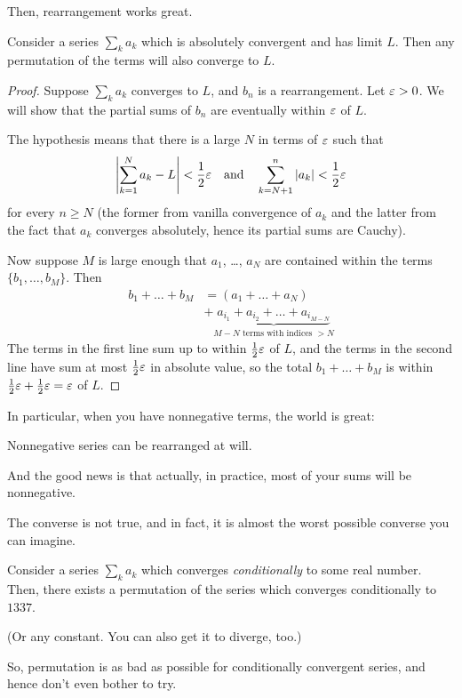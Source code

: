 Then, rearrangement works great.
\begin{theorem}
	Consider a series $\sum_k a_k$ which is absolutely convergent
	and has limit $L$.
	Then any permutation of the terms will also converge to $L$.
\end{theorem}
\begin{proof}
	Suppose $\sum_k a_k$ converges to $L$,
	and $b_n$ is a rearrangement.
	Let $\varepsilon > 0$.
	We will show that the partial sums of $b_n$
	are eventually within $\varepsilon$ of $L$.

	The hypothesis means that there is a large $N$ in terms of $\varepsilon$
	such that
	\[ \left\lvert \sum_{k=1}^N a_k - L \right\rvert < \frac{1}{2}\varepsilon
		\quad\text{and}\quad
		\sum_{k = N+1}^{n} \left\lvert a_k \right\rvert < \frac{1}{2}\varepsilon
	\]
	for every $n \ge N$ (the former from vanilla convergence of $a_k$
	and the latter from the fact that $a_k$ converges absolutely,
	hence its partial sums are Cauchy).

	Now suppose $M$ is large enough that $a_1$, \dots, $a_N$
	are contained within the terms $\{b_1, \dots, b_M\}$.
	Then
	\begin{align*}
		b_1 + \dots + b_M
		&= (a_1 + \dots + a_N) \\
		&+ \underbrace{a_{i_1} + a_{i_2} + \dots + a_{i_{M-N}}}%
		_{\text{$M-N$ terms with indices $> N$}}
	\end{align*}
	The terms in the first line sum up to within $\frac{1}{2}\varepsilon$ of $L$,
	and the terms in the second line have sum at most $\frac{1}{2}\varepsilon$
	in absolute value, so the total $b_1 + \dots + b_M$
	is within $\frac{1}{2}\varepsilon + \frac{1}{2}\varepsilon = \varepsilon$ of $L$.
\end{proof}
In particular, when you have nonnegative terms, the world is great:
\begin{moral}
	Nonnegative series can be rearranged at will.
\end{moral}
And the good news is that actually,
in practice, most of your sums will be nonnegative.

The converse is not true,
and in fact, it is almost the worst possible converse you can imagine.
\begin{theorem}
	Consider a series $\sum_k a_k$ which converges \emph{conditionally}
	to some real number.
	Then, there exists a permutation of the series
	which converges conditionally to $1337$.

	(Or any constant.  You can also get it to diverge, too.)
\end{theorem}
So, permutation is as bad as possible for conditionally convergent
series, and hence don't even bother to try.

